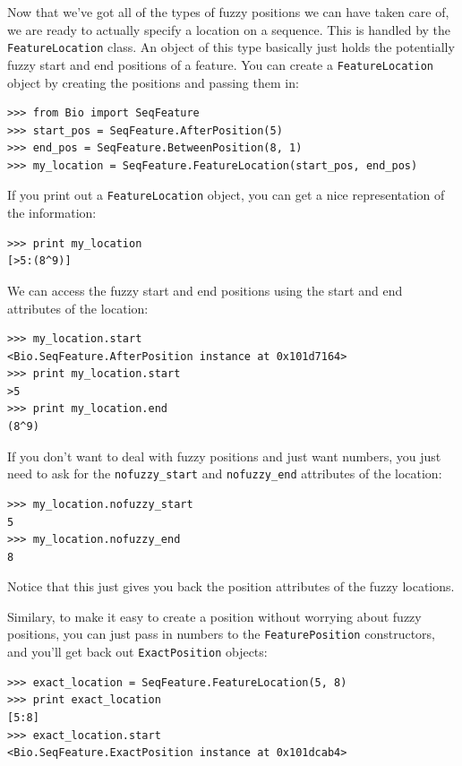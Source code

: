 \documentclass{report}
\begin{document}
Now that we've got all of the types of fuzzy positions we can have taken care of, we are ready to actually specify a location on a sequence. This is handled by the \verb|FeatureLocation| class. An object of this type basically just holds the potentially fuzzy start and end positions of a feature. You can create a \verb|FeatureLocation| object by creating the positions and passing them in:

\begin{verbatim}
>>> from Bio import SeqFeature
>>> start_pos = SeqFeature.AfterPosition(5)
>>> end_pos = SeqFeature.BetweenPosition(8, 1)
>>> my_location = SeqFeature.FeatureLocation(start_pos, end_pos)
\end{verbatim}

If you print out a \verb|FeatureLocation| object, you can get a nice representation of the information:

\begin{verbatim}
>>> print my_location
[>5:(8^9)]
\end{verbatim}

We can access the fuzzy start and end positions using the start and end attributes of the location:

\begin{verbatim}
>>> my_location.start
<Bio.SeqFeature.AfterPosition instance at 0x101d7164>
>>> print my_location.start
>5
>>> print my_location.end
(8^9)
\end{verbatim}

If you don't want to deal with fuzzy positions and just want numbers, you just need to ask for the \verb|nofuzzy_start| and \verb|nofuzzy_end| attributes of the location:

\begin{verbatim}
>>> my_location.nofuzzy_start
5
>>> my_location.nofuzzy_end
8
\end{verbatim}

Notice that this just gives you back the position attributes of the fuzzy locations.

Similary, to make it easy to create a position without worrying about fuzzy positions, you can just pass in numbers to the \verb|FeaturePosition| constructors, and you'll get back out \verb|ExactPosition| objects:

\begin{verbatim}
>>> exact_location = SeqFeature.FeatureLocation(5, 8)
>>> print exact_location
[5:8]
>>> exact_location.start
<Bio.SeqFeature.ExactPosition instance at 0x101dcab4>
\end{verbatim}
\end{document}

